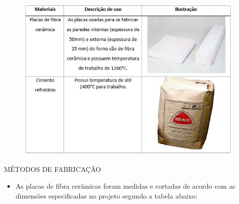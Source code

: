 \begin{figure}[H]
	\centering
	\label{res1}
	\includegraphics[keepaspectratio=true,scale=0.8]{figuras/res1.JPG}
\end{figure}

 MÉTODOS DE FABRICAÇÃO 
\begin{itemize}
	\item As placas de fibra cerâmicas foram medidas e cortadas de acordo com as dimensões especificadas no projeto segundo a tabela abaixo:
\end{itemize}	
 
